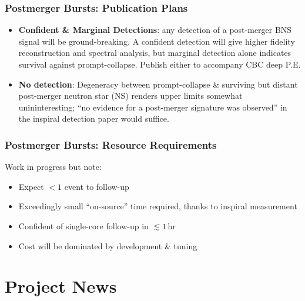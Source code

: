 \documentclass{beamer}
\def\ns#1{neutron star#1 (NS#1)\gdef\ns{NS}}
\begin{document}
\begin{frame}
    \frametitle{Postmerger Bursts: Publication Plans}
    \begin{itemize}
        \item {\bf Confident \& Marginal Detections}: any detection of a
            post-merger BNS signal will be ground-breaking.  A confident
            detection will give higher fidelity reconstruction and spectral
            analysis, but marginal detection alone indicates survival against
            prompt-collapse.  Publish either to accompany CBC deep P.E.
        \item {\bf No detection}: Degeneracy between prompt-collapse \&
            surviving but distant post-merger \ns{} renders upper limits
            somewhat unininteresting; ``no evidence for a post-merger signature
            was observed'' in the inspiral detection paper would suffice.
    \end{itemize}
\end{frame}

\begin{frame}
    \frametitle{Postmerger Bursts: Resource Requirements}
    Work in progress but note:
    \begin{itemize}
        \item Expect $<1$ event to follow-up
        \item Exceedingly small ``on-source'' time required, thanks to inspiral
            measurement
        \item Confident of single-core follow-up in $\lesssim 1$\,hr
        \item Cost will be dominated by development \& tuning
    \end{itemize}
\end{frame}


\section{Project News} 
\begin{frame}\tableofcontents[currentsection]
\end{frame}
\end{document}
